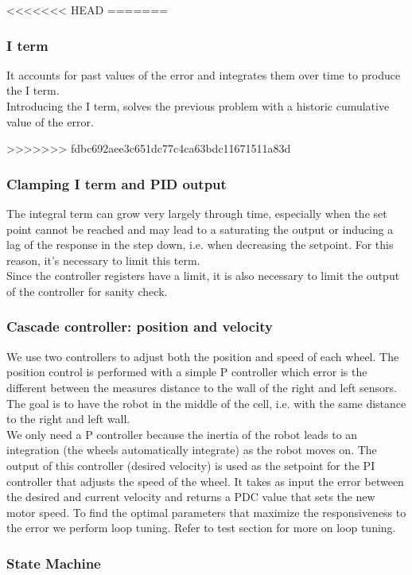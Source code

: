 <<<<<<< HEAD
=======
\subsubsection*{I term}

It accounts for past values of the error and integrates them over time to produce the I term. \\
Introducing the I term, solves the previous problem with a historic cumulative value of the error.

>>>>>>> fdbc692aee3c651dc77c4ca63bdc11671511a83d
\subsubsection*{Clamping I term and PID output}

The integral term can grow very largely through time, especially when the set point cannot be reached and may lead to a saturating the output or inducing a lag of the response in the step down, i.e. when decreasing the setpoint. For this reason, it’s necessary to limit this term.\\
Since the controller registers have a limit, it is also necessary to limit the output of the controller for sanity check. 

\subsubsection*{Cascade controller: position and velocity}

We use two controllers to adjust both the position and speed of each wheel. 
\vskip 0.1in
\noindent
The position control is performed with a simple P controller which error is the different between the measures distance to the wall of the right and left sensors. The goal is to have the robot in the middle of the cell, i.e. with the same distance to the right and left wall.\\
We only need a P controller because the inertia of the robot leads to an integration (the wheels automatically integrate) as the robot moves on.
\vskip 0.1in
\noindent
The output of this controller (desired velocity) is used as the setpoint for the PI controller that adjusts the speed of the wheel. It takes as input the error between the desired and current velocity and returns a PDC value that sets the new motor speed.
\vskip 0.1in
\noindent
To find the optimal parameters that maximize the responsiveness to the error we perform loop tuning. Refer to test section for more on loop tuning. 

\subsubsection{State Machine}

